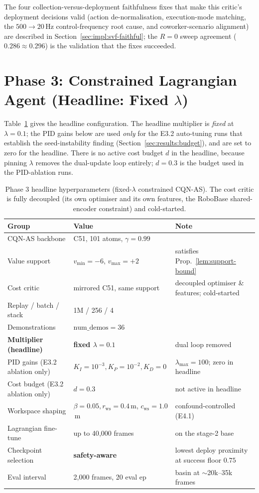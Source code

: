 \documentclass[11pt,a4paper]{report}
\newcommand{\cqnas}{CQN-AS}
\begin{document}
The four collection-versus-deployment faithfulness fixes that make
this critic's deployment decisions valid (action de-normalisation,
execution-mode matching, the $500 \rightarrow 20$\,Hz control-frequency
root cause, and coworker-scenario alignment) are described in
Section~\ref{sec:impl:svf-faithful}; the $R = 0$ sweep agreement
($0.286 \approx 0.296$) is the validation that the fixes succeeded.

\section{Phase 3: Constrained Lagrangian Agent (Headline: Fixed $\lambda$)}
\label{app:hparams:lagrangian}

Table~\ref{tab:app-hparams-lagrangian} gives the headline
configuration. The headline multiplier is \emph{fixed} at
$\lambda = 0.1$; the PID gains below are used \emph{only} for the
E3.2 auto-tuning runs that establish the seed-instability finding
(Section~\ref{sec:results:budget}), and are set to zero for the
headline. There is no active cost budget $d$ in the headline, because
pinning $\lambda$ removes the dual-update loop entirely; $d = 0.3$ is
the budget used in the PID-ablation runs.

\begin{table}[htbp]
\centering
\small
\caption{Phase 3 headline hyperparameters (fixed-$\lambda$
constrained \cqnas{}). The cost critic is fully decoupled (its own
optimiser and its own features, the RoboBase shared-encoder
constraint) and cold-started.}
\label{tab:app-hparams-lagrangian}
\begin{tabular}{lll}
\toprule
Group & Value & Note \\
\midrule
\cqnas{} backbone & C51, 101 atoms, $\gamma = 0.99$ & \cite{seo2024cqnas} \\
Value support & $v_{\min} = -6$, $v_{\max} = +2$ & satisfies Prop.~\ref{lem:support-bound} \\
Cost critic & mirrored C51, same support & decoupled optimiser \& features; cold-started \\
Replay / batch / stack & 1M / 256 / 4 & \\
Demonstrations & $\text{num\_demos} = 36$ & \\
\textbf{Multiplier (headline)} & \textbf{fixed $\lambda = 0.1$} & dual loop removed \\
PID gains (E3.2 ablation only) & $K_I{=}10^{-3}, K_P{=}10^{-2}, K_D{=}0$ & $\lambda_{\max}{=}100$; zero in headline \\
Cost budget (E3.2 ablation only) & $d = 0.3$ & not active in headline \\
Workspace shaping & $\beta{=}0.05, r_{\mathrm{ws}}{=}0.4$\,m, $c_{\mathrm{ws}}{=}1.0$\,m & confound-controlled (E4.1) \\
Lagrangian fine-tune & up to 40{,}000 frames & on the stage-2 base \\
Checkpoint selection & \textbf{safety-aware} & lowest deploy proximity at success floor $0.75$ \\
Eval interval & 2{,}000 frames, 20 eval ep & basin at $\sim$20k--35k frames \\
\bottomrule
\end{tabular}
\end{table}
\end{document}

